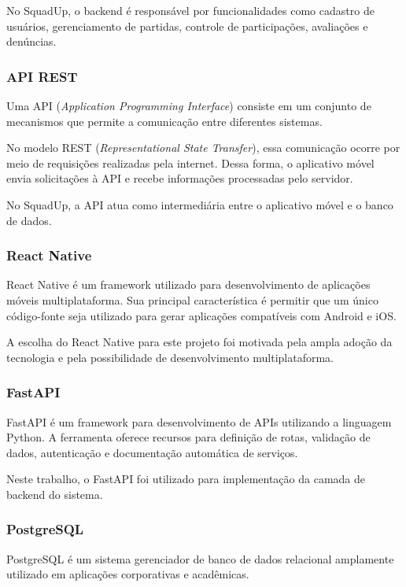 \documentclass[a4paper, 12pt]{article}
\begin{document}
\begin{justify}
No SquadUp, o backend é responsável por funcionalidades como cadastro de usuários, gerenciamento de partidas, controle de participações, avaliações e denúncias.

\subsubsection{API REST}

Uma API (\textit{Application Programming Interface}) consiste em um conjunto de mecanismos que permite a comunicação entre diferentes sistemas.

No modelo REST (\textit{Representational State Transfer}), essa comunicação ocorre por meio de requisições realizadas pela internet. Dessa forma, o aplicativo móvel envia solicitações à API e recebe informações processadas pelo servidor.

No SquadUp, a API atua como intermediária entre o aplicativo móvel e o banco de dados.

\subsubsection{React Native}

React Native é um framework utilizado para desenvolvimento de aplicações móveis multiplataforma. Sua principal característica é permitir que um único código-fonte seja utilizado para gerar aplicações compatíveis com Android e iOS.

A escolha do React Native para este projeto foi motivada pela ampla adoção da tecnologia e pela possibilidade de desenvolvimento multiplataforma.

\subsubsection{FastAPI}

FastAPI é um framework para desenvolvimento de APIs utilizando a linguagem Python. A ferramenta oferece recursos para definição de rotas, validação de dados, autenticação e documentação automática de serviços.

Neste trabalho, o FastAPI foi utilizado para implementação da camada de backend do sistema.

\subsubsection{PostgreSQL}

PostgreSQL é um sistema gerenciador de banco de dados relacional amplamente utilizado em aplicações corporativas e acadêmicas.


\end{justify}
\end{document}

